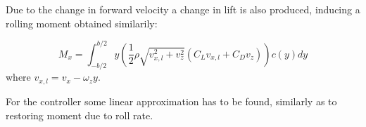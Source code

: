 Due to the change in forward velocity a change in lift is also produced, inducing a rolling moment obtained similarily:

\begin{equation}
	M_x = \int_{-b/2}^{b/2} y \left( \frac{1}{2} \rho \sqrt{v_{x,l}^2 + v_z^2} \left( C_L v_{x,l} + C_D v_{z} \right) \right) c(y) dy
\end{equation}
where $v_{x,l} = v_x - \omega_z y$.

For the controller some linear approximation has to be found, similarly as to restoring moment due to roll rate.